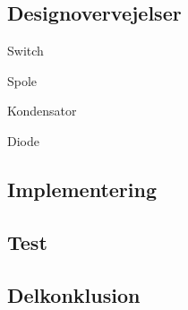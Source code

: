\documentclass[../main.tex]{subfiles}
\begin{document}
    \subsection{Designovervejelser}
            
            Switch

            Spole

            Kondensator

            Diode


            
    \subsection{Implementering}
        
    \subsection{Test}
        
    \subsection{Delkonklusion}
        
        
\end{document}
